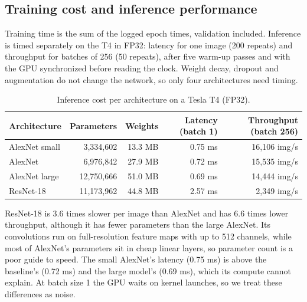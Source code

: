 \documentclass[11pt,a4paper]{article}
\begin{document}
\subsection{Training cost and inference performance}
Training time is the sum of the logged epoch times, validation included. Inference is timed separately on the T4 in FP32: latency for one image (200 repeats) and throughput for batches of 256 (50 repeats), after five warm-up passes and with the GPU synchronized before reading the clock. Weight decay, dropout and augmentation do not change the network, so only four architectures need timing.

\begin{table}[htbp]\centering\small
\caption{Inference cost per architecture on a Tesla T4 (FP32).}\label{tab:inference}
\begin{tabular}{lrrrr}\toprule
Architecture & Parameters & Weights & Latency (batch 1) & Throughput (batch 256)\\\midrule
AlexNet small & 3{,}334{,}602 & 13.3 MB & 0.75 ms & 16{,}106 img/s\\
AlexNet & 6{,}976{,}842 & 27.9 MB & 0.72 ms & 15{,}535 img/s\\
AlexNet large & 12{,}750{,}666 & 51.0 MB & 0.69 ms & 14{,}444 img/s\\
ResNet-18 & 11{,}173{,}962 & 44.8 MB & 2.57 ms & 2{,}349 img/s\\\bottomrule
\end{tabular}\end{table}

ResNet-18 is 3.6 times slower per image than AlexNet and has 6.6 times lower throughput, although it has fewer parameters than the large AlexNet. Its convolutions run on full-resolution feature maps with up to 512 channels, while most of AlexNet's parameters sit in cheap linear layers, so parameter count is a poor guide to speed. The small AlexNet's latency (0.75 ms) is above the baseline's (0.72 ms) and the large model's (0.69 ms), which its compute cannot explain. At batch size 1 the GPU waits on kernel launches, so we treat these differences as noise.
\end{document}
